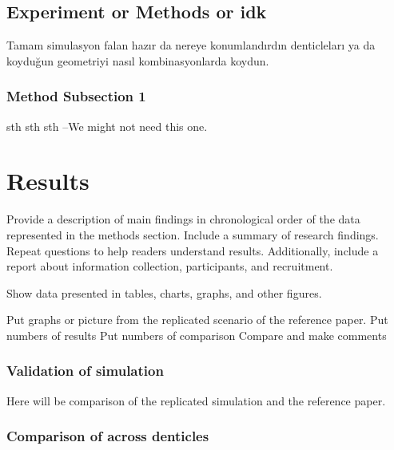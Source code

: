 \documentclass[graybox]{svmult}
\begin{document}


\subsection{Experiment or Methods or idk}
\label{subsec:5}

Tamam simulasyon falan hazır da nereye konumlandırdın denticleları ya da koyduğun geometriyi nasıl kombinasyonlarda koydun. 


\subsubsection{Method Subsection 1}
sth sth sth --We might not need this one.


\section{Results}
\label{sec:4}
Provide a description of main findings in chronological order of the data represented in the methods section. Include a summary of research findings. Repeat questions to help readers understand results. Additionally, include a report about information collection, participants, and recruitment.

Show data presented in tables, charts, graphs, and other figures.

Put graphs or picture from the replicated scenario of the reference paper. 
Put numbers of results
Put numbers of comparison 
Compare and make comments 


 
\subsubsection{Validation of simulation}


Here will be comparison of the replicated simulation and the reference paper. 

\subsubsection{Comparison of across denticles}
\end{document}
